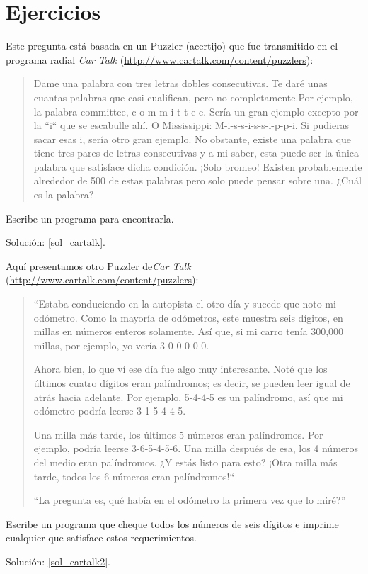\section{Ejercicios}

\begin{exercise}
\label{cartalk}

Este pregunta está basada en un Puzzler (acertijo) que fue transmitido en
el programa radial {\em Car Talk} 
(\url{http://www.cartalk.com/content/puzzlers}):

\begin{quote}
Dame una palabra con tres letras dobles consecutivas. Te daré unas
cuantas palabras que casi cualifican, pero no completamente.Por ejemplo,
la palabra committee, c-o-m-m-i-t-t-e-e. Sería un gran ejemplo excepto
por la ``i`` que se escabulle ahí. O Mississippi: M-i-s-s-i-s-s-i-p-p-i.
Si pudieras sacar esas i, sería otro gran ejemplo. No obstante, existe
una palabra que tiene tres pares de letras consecutivas y a mi saber,
esta puede ser la única palabra que satisface dicha condición. 
¡Solo bromeo! Existen probablemente alrededor de 500 de estas palabras pero
solo puede pensar sobre una. ¿Cuál es la palabra?
\end{quote}

Escribe un programa para encontrarla.

Solución: \ref{sol_cartalk}.

\end{exercise}


\begin{exercise}
Aquí presentamos otro Puzzler de{\em Car Talk}
(\url{http://www.cartalk.com/content/puzzlers}):
\label{cartalk2}

\begin{quote}
``Estaba conduciendo en la autopista el otro día y sucede que
noto mi odómetro. Como la mayoría de odómetros, este
muestra seis dígitos, en millas en números enteros solamente. 
Así que, si mi carro tenía 300,000 millas, por ejemplo, yo 
vería 3-0-0-0-0-0.

Ahora bien, lo que ví ese día fue algo muy interesante. Noté que 
los últimos cuatro dígitos eran palíndromos; es decir, se
pueden leer igual de atrás hacia adelante. Por ejemplo, 5-4-4-5 
es un palíndromo, así que mi odómetro podría leerse 3-1-5-4-4-5.

Una milla más tarde, los últimos 5 números eran palíndromos. Por ejemplo,
podría leerse 3-6-5-4-5-6.  Una milla después de esa, los 4 números
del medio eran palíndromos. ¿Y estás listo para esto? ¡Otra milla más
tarde, todos los 6 números eran palíndromos!``

``La pregunta es, qué había en el odómetro la primera vez que lo miré?''
\end{quote}

Escribe un programa que cheque todos los números de seis dígitos
e imprime cualquier que satisface estos requerimientos.
  
Solución: \ref{sol_cartalk2}.

\end{exercise}


